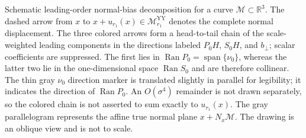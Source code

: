 \caption{Schematic leading-order normal-bias decomposition for a curve
$\mathcal M\subset\mathbb R^3$. The dashed arrow from $x$ to
$x+u_{r_1}(x)\in\mathcal M_{r_1}^{\mathrm{YY}}$ denotes the complete normal
displacement. The three colored arrows form a head-to-tail chain of the
scale-weighted leading components in the directions labeled $P_0H$,
$S_0H$, and $b_\perp$; scalar coefficients are suppressed. The first lies
in $\operatorname{Ran}P_0=\operatorname{span}\{\nu_0\}$, whereas the latter
two lie in the one-dimensional space $\operatorname{Ran}S_0$ and are
therefore collinear. The thin gray $\nu_0$ direction marker is translated
slightly in parallel for legibility; it indicates the direction of
$\operatorname{Ran}P_0$. An $O(\sigma^4)$ remainder is not drawn separately,
so the colored chain is not asserted to sum exactly to $u_{r_1}(x)$.
The gray parallelogram represents
the affine true normal plane $x+N_x\mathcal M$. The drawing is an oblique
view and is not to scale.}
\label{fig:yy-normal-decomposition}
